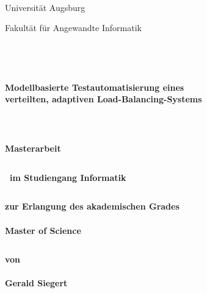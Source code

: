 \thispagestyle{empty}

\begin{figure}[t]
\centering
~~~~~~~~~~
\end{figure}

\begin{center}
\Large{Universität Augsburg}\\
\end{center}

\begin{center}
\Large{Fakultät für Angewandte Informatik}
\end{center}
\begin{verbatim}




\end{verbatim}
\begin{center}
    \textbf{\large{Modellbasierte Testautomatisierung eines\\ verteilten, adaptiven Load-Balancing-Systems}}
\end{center}
\begin{verbatim}



\end{verbatim}
\begin{center}
\doublespacing
\textbf{\Large{Masterarbeit}}
\singlespacing
\begin{verbatim}

\end{verbatim}
\textbf{{~im Studiengang Informatik~}}
\end{center}
\begin{verbatim}

\end{verbatim}
\begin{center}
\textbf{zur Erlangung des akademischen Grades \\\ \\ Master of Science}
\end{center}
\begin{verbatim}

\end{verbatim}
\begin{center}
    \textbf{von \\\ \\ Gerald Siegert}
\end{center}


